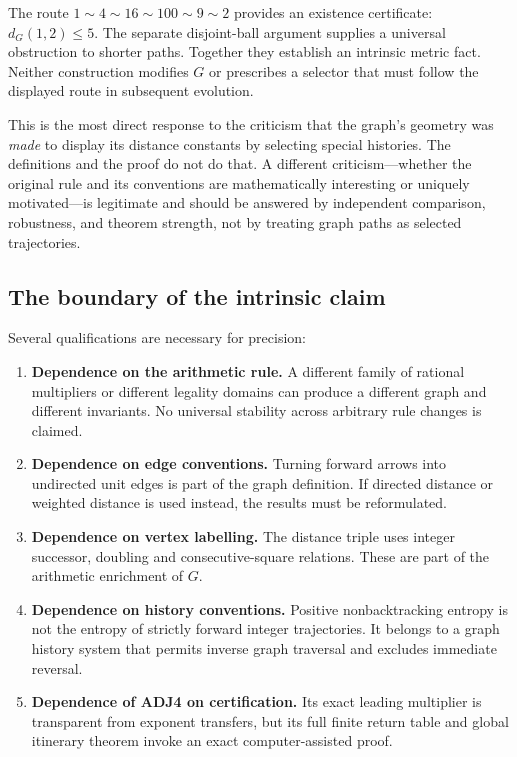 \documentclass[11pt,a4paper]{article}
\theoremstyle{definition}\newtheorem{definition}[theorem]{Definition}
\begin{document}
The route $1\sim4\sim16\sim100\sim9\sim2$ provides an existence certificate: $d_G(1,2)\le5$. The separate disjoint-ball argument supplies a universal obstruction to shorter paths. Together they establish an intrinsic metric fact. Neither construction modifies $G$ or prescribes a selector that must follow the displayed route in subsequent evolution.

This is the most direct response to the criticism that the graph's geometry was \emph{made} to display its distance constants by selecting special histories. The definitions and the proof do not do that. A different criticism---whether the original rule and its conventions are mathematically interesting or uniquely motivated---is legitimate and should be answered by independent comparison, robustness, and theorem strength, not by treating graph paths as selected trajectories.

\subsection{The boundary of the intrinsic claim}
Several qualifications are necessary for precision:
\begin{enumerate}
\item \textbf{Dependence on the arithmetic rule.} A different family of rational multipliers or different legality domains can produce a different graph and different invariants. No universal stability across arbitrary rule changes is claimed.
\item \textbf{Dependence on edge conventions.} Turning forward arrows into undirected unit edges is part of the graph definition. If directed distance or weighted distance is used instead, the results must be reformulated.
\item \textbf{Dependence on vertex labelling.} The distance triple uses integer successor, doubling and consecutive-square relations. These are part of the arithmetic enrichment of $G$.
\item \textbf{Dependence on history conventions.} Positive nonbacktracking entropy is not the entropy of strictly forward integer trajectories. It belongs to a graph history system that permits inverse graph traversal and excludes immediate reversal.
\item \textbf{Dependence of ADJ4 on certification.} Its exact leading multiplier is transparent from exponent transfers, but its full finite return table and global itinerary theorem invoke an exact computer-assisted proof.
\end{enumerate}
\end{document}
